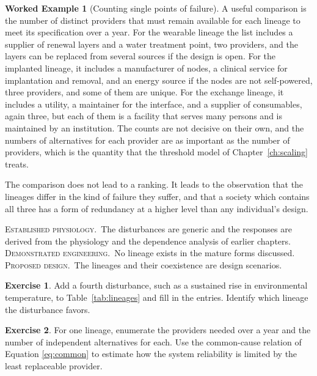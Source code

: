 \documentclass[11pt,openany]{book}
\theoremstyle{definition}
\newtheorem{example}{Worked Example}[chapter]
\newtheorem{exercise}{Exercise}[chapter]
\theoremstyle{remark}
\newcommand{\est}{\textsc{Established physiology.}\ }
\newcommand{\dem}{\textsc{Demonstrated engineering.}\ }
\newcommand{\pro}{\textsc{Proposed design.}\ }
\begin{document}
\begin{example}[Counting single points of failure]
\label{ex:spof}
A useful comparison is the number of distinct providers that must remain available for each lineage to meet its specification over a year. For the wearable lineage the list includes a supplier of renewal layers and a water treatment point, two providers, and the layers can be replaced from several sources if the design is open. For the implanted lineage, it includes a manufacturer of nodes, a clinical service for implantation and removal, and an energy source if the nodes are not self-powered, three providers, and some of them are unique. For the exchange lineage, it includes a utility, a maintainer for the interface, and a supplier of consumables, again three, but each of them is a facility that serves many persons and is maintained by an institution. The counts are not decisive on their own, and the numbers of alternatives for each provider are as important as the number of providers, which is the quantity that the threshold model of Chapter~\ref{ch:scaling} treats.
\end{example}

The comparison does not lead to a ranking. It leads to the observation that the lineages differ in the kind of failure they suffer, and that a society which contains all three has a form of redundancy at a higher level than any individual's design.

\begin{evidence}
\est The disturbances are generic and the responses are derived from the physiology and the dependence analysis of earlier chapters. \dem No lineage exists in the mature forms discussed. \pro The lineages and their coexistence are design scenarios.
\end{evidence}

\begin{exercise}
Add a fourth disturbance, such as a sustained rise in environmental temperature, to Table~\ref{tab:lineages} and fill in the entries. Identify which lineage the disturbance favors.
\end{exercise}

\begin{exercise}
For one lineage, enumerate the providers needed over a year and the number of independent alternatives for each. Use the common-cause relation of Equation \eqref{eq:common} to estimate how the system reliability is limited by the least replaceable provider.
\end{exercise}
\end{document}
